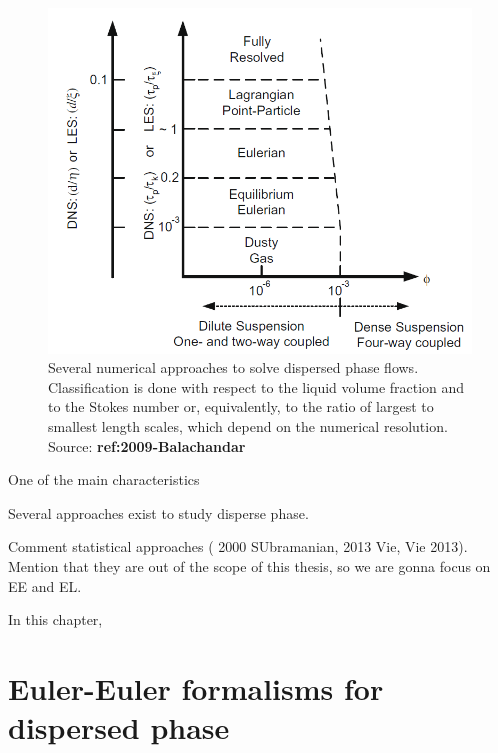 \begin{figure}[h!]
	\centering
	\includegraphics[scale=0.5]{./part1_numerical_approaches/figures_ch3/balachandar_disperse_phase_classification}
	\caption{Several numerical approaches to solve dispersed phase flows. Classification is done with respect to the liquid volume fraction and to the Stokes number or, equivalently, to the ratio of largest to smallest length scales, which depend on the numerical resolution.  Source: \textbf{ref:2009-Balachandar}}
	\label{fig:balachandar_numerical_methods_representation}
\end{figure}


One of the main characteristics

Several approaches exist to study disperse phase. 

Comment statistical approaches ( 2000 SUbramanian, 2013 Vie, Vie 2013). Mention that they are out of the scope of this thesis, so we are gonna focus on EE and EL.



In this chapter, 

\section{Euler-Euler formalisms for dispersed phase}

